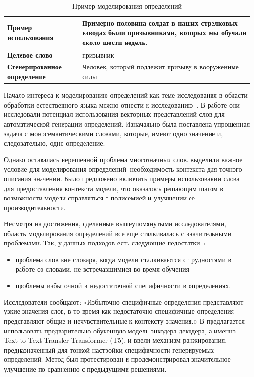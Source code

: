 \documentclass[LI,VKR]{HSEUniversity}
\begin{document}
\begin{table}[H]
\centering
\caption{Пример моделирования определений}
\label{tab:Definition modeling example}
\begin{tabular}{|l|p{8cm}|}
\hline
\textbf{Пример использования} & Примерно половина солдат в наших стрелковых взводах были призывниками, которых мы обучали около шести недель. \\
\hline
\textbf{Целевое слово} & призывник \\
\hline
\textbf{Сгенерированное определение} & Человек, который подлежит призыву в вооруженные силы \\
\hline
\end{tabular}
\end{table}

Начало интереса к моделированию определений как теме исследования
в области обработки естественного языка можно отнести
к исследованию~\cite{noraset2016definition}.
В работе они исследовали потенциал использования векторных представлений слов
для автоматической генерации определений.
Изначально была поставлена упрощенная задача с моносемантическими словами,
которые, имеют одно значение и, следовательно, одно определение.

Однако оставалась нерешенной проблема многозначных слов.
\cite{gadetsky-etal-2018-conditional} выделили важное условие для моделирования определений:
необходимость контекста для точного описания значений.
Было предложено включить примеры использований слова для предоставления контекста модели,
что оказалось решающим шагом в возможности модели справляться с полисемией и улучшении
ее производительности.

Несмотря на достижения, сделанные вышеупомянутыми исследователями,
область моделирования определений все еще сталкивалась с значительными проблемами.
Так, у данных подходов есть следующие недостатки~\cite{huang-etal-2021-definition}:
\begin{itemize}
    \item проблема слов вне словаря, когда модели сталкиваются с трудностями в работе со словами,
не встречавшимися во время обучения,
    \item проблемы избыточной и недостаточной специфичности в определениях.
\end{itemize}
Исследователи сообщают: «Избыточно специфичные определения представляют узкие значения слов,
в то время как недостаточно специфичные определения представляют общие и
нечувствительные к контексту значения.»
В \cite{huang-etal-2021-definition} предлагается использовать предварительно обученную модель энкодера-декодера,
а именно Text-to-Text Transfer Transformer (T5),
и ввели механизм ранжирования, предназначенный для тонкой настройки специфичности
генерируемых определений.
Метод был протестирован и продемонстрировал значительное
улучшение по сравнению с предыдущими решениями.
\end{document}
